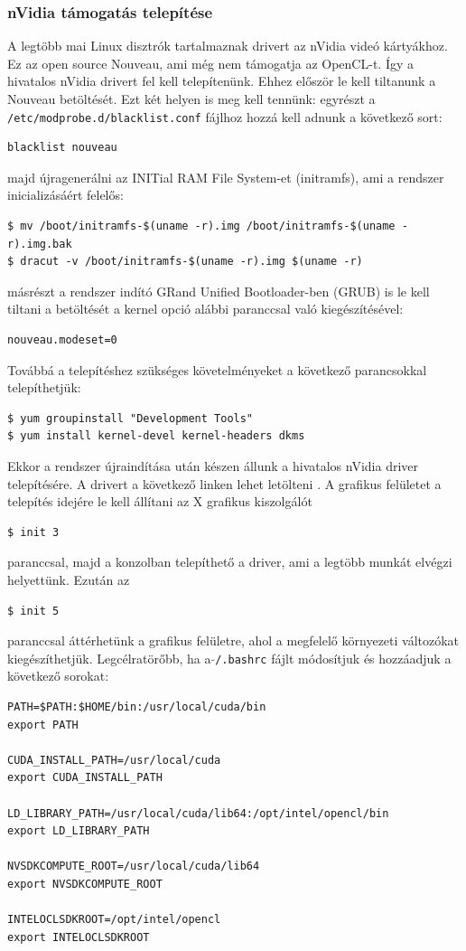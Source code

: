 \subsubsection*{nVidia támogatás telepítése}
	A legtöbb mai Linux disztrók tartalmaznak drivert az nVidia videó kártyákhoz.
	Ez az open source Nouveau, ami még nem támogatja az OpenCL-t.
	Így a hivatalos nVidia drivert fel kell telepítenünk.
	Ehhez először le kell tiltanunk a Nouveau betöltését.
	Ezt két helyen is meg kell tennünk: 
	egyrészt a \texttt{/etc/modprobe.d/blacklist.conf} fájlhoz hozzá kell adnunk a
	következő sort:
\begin{lstlisting}
blacklist nouveau
\end{lstlisting}
	majd újragenerálni az INITial RAM File System-et (initramfs), ami a rendszer
	inicializásáért felelős:
\begin{lstlisting}
$ mv /boot/initramfs-$(uname -r).img /boot/initramfs-$(uname -r).img.bak
$ dracut -v /boot/initramfs-$(uname -r).img $(uname -r)
\end{lstlisting}
	másrészt a rendszer indító GRand Unified Bootloader-ben (GRUB) is le kell
	tiltani a betöltését a kernel opció alábbi paranccsal való kiegészítésével:
\begin{lstlisting}
nouveau.modeset=0
\end{lstlisting}
	Továbbá a telepítéshez szükséges követelményeket a következő parancsokkal telepíthetjük:
\begin{lstlisting}
$ yum groupinstall "Development Tools"
$ yum install kernel-devel kernel-headers dkms
\end{lstlisting}
	Ekkor a rendszer újraindítása után készen állunk a hivatalos nVidia driver
	telepítésére. A drivert a következő linken lehet letölteni \cite{nvidia-driver}.
	A grafikus felületet a telepítés idejére le kell állítani az X grafikus
	kiszolgálót
\begin{lstlisting}
$ init 3
\end{lstlisting}
	paranccsal, majd a konzolban telepíthető a driver, ami a legtöbb munkát elvégzi helyettünk. Ezután az
\begin{lstlisting}
$ init 5
\end{lstlisting}
	paranccsal áttérhetünk a grafikus felületre, ahol a megfelelő környezeti változókat kiegészíthetjük.
	Legcélratörőbb, ha a \texttt{$\tilde{}$/.bashrc} fájlt módosítjuk és hozzáadjuk
	a következő sorokat:
\begin{lstlisting}
PATH=$PATH:$HOME/bin:/usr/local/cuda/bin
export PATH

CUDA_INSTALL_PATH=/usr/local/cuda
export CUDA_INSTALL_PATH

LD_LIBRARY_PATH=/usr/local/cuda/lib64:/opt/intel/opencl/bin
export LD_LIBRARY_PATH

NVSDKCOMPUTE_ROOT=/usr/local/cuda/lib64
export NVSDKCOMPUTE_ROOT

INTELOCLSDKROOT=/opt/intel/opencl
export INTELOCLSDKROOT
\end{lstlisting}
